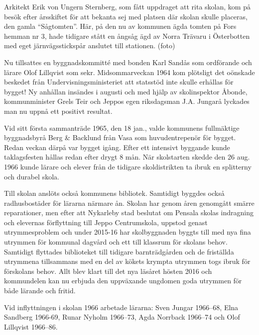 Arkitekt Erik von Ungern Sternberg, som fått uppdraget att rita skolan, kom på besök efter årsskiftet för att bekanta sej med platsen där skolan skulle placeras, den gamla ``Sågtomten''. Här, på den nu av kommunen ägda tomten på Fors hemman nr 3, hade tidigare stått en ångsåg ägd av Norra Trävaru i Österbotten med eget järnvägsstickspår anslutet till stationen. (foto)

Nu tillsattes en byggnadskommitté med bonden Karl Sandås som ordförande och lärare Olof Lillqvist som sekr. Midsommarveckan 1964 kom plötsligt det oönskade beskedet från Undervisningsministeriet att statsstöd inte skulle erhållas för bygget! Ny anhållan insändes i augusti och med hjälp av skolinspektor Åbonde, kommunminister Grels Teir och Jeppos egen riksdagsman J.A. Jungarå lyckades man nu uppnå ett positivt resultat.

Vid sitt första sammanträde 1965,  den 18 jan., valde kommunens fullmäktige byggnadsbyrå Berg \& Backlund från Vasa som huvudentrepenör för bygget. Redan veckan därpå var bygget igång. Efter ett intensivt byggande kunde taklagsfesten hållas redan efter drygt 8 mån. När skolstarten skedde den 26 aug. 1966 kunde lärare och elever från de tidigare skoldistrikten ta ibruk en splitterny och durabel skola.

Till skolan anslöts också kommunens bibliotek. Samtidigt byggdes också radhusbostäder för lärarna närmare ån. Skolan har genom åren genomgått smärre reparationer, men efter att Nykarleby stad beslutat om Pensala skolas indragning och elevernas förflyttning till Jeppo Centrumskola, uppstod genast utrymmesproblem och under 2015-16 har skolbyggnaden byggts till med nya fina utrymmen för kommunal dagvård och ett till klassrum för skolans behov. Samtidigt flyttades biblioteket till tidigare barnträdgården och de friställda utrymmena tillsammans med en del av kökets krympta  utrymmen togs ibruk för förskolans behov. Allt blev klart till det nya läsåret hösten 2016 och kommundelen kan nu erbjuda den uppväxande ungdomen goda utrymmen för både lärande och fritid.

Vid inflyttningen i skolan 1966 arbetade lärarna: Sven Jungar 1966--68, Elna Sandberg 1966-69, Runar Nyholm 1966--73, Agda Norrback 1966--74 och Olof Lillqvist 1966--86.

